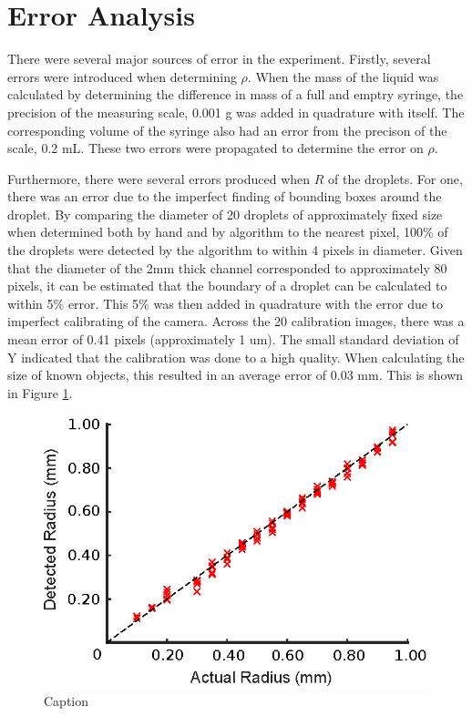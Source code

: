 \documentclass{physics_article_B}
\begin{document}
\section{Error Analysis} 
    
    There were several major sources of error in the experiment. Firstly, several errors were introduced when determining $\rho$. When the mass of the liquid was calculated by determining the difference in mass of a full and emptry syringe, the precision of the measuring scale, 0.001 g was added in quadrature with itself. The corresponding volume of the syringe also had an error from the precison of the scale, 0.2 mL. These two errors were propagated to determine the error on $\rho$.
    
    Furthermore, there were several errors produced when $R$ of the droplets. For one, there was an error due to the imperfect finding of bounding boxes around the droplet. By comparing the diameter of 20 droplets of approximately fixed size when determined both by hand and by algorithm to the nearest pixel, 100\% of the droplets were detected by the algorithm to within 4 pixels in diameter. Given that the diameter of the 2mm thick channel corresponded to approximately 80 pixels, it can be estimated that the boundary of a droplet can be calculated to within 5\% error. This 5\% was then added in quadrature with the error due to imperfect calibrating of the camera. Across the 20 calibration images, there was a mean error of 0.41 pixels (approximately 1 um). The small standard deviation of Y indicated that the calibration was done to a high quality. When calculating the size of known objects, this resulted in an average error of 0.03 mm. This is shown in Figure \ref{fig:calib:error}. 
        
            \begin{figure}[H]
                \centering
                \hspace*{-1cm}\includegraphics{Figures/CameraCalib.eps}
                \caption{Caption}
                \label{fig:calib:error}
            \end{figure}
    
\end{document}
